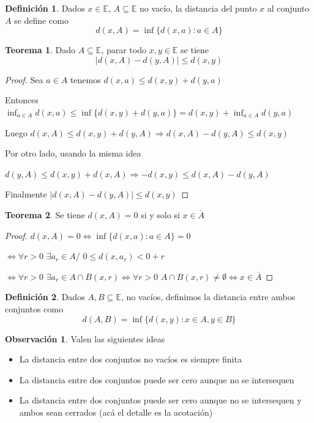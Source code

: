 \documentclass[12pt]{article}
\newcommand{\E}{\mathbb{E}}
\newcommand{\Ra}{\Rightarrow}
\newcommand{\ol}{\overline}
\theoremstyle{definition}
\newtheorem{definition}{Definición}[section]
\newtheorem*{remark}{Observación}
\newtheorem{theorem}{Teorema}
\begin{document}
\begin{definition}
  Dados $x \in \E$, $A \subseteq \E$ no vacío, la distancia del punto $x$ al conjunto $A$ se define como 
  $$d(x,A)  = \inf{\{d(x,a) : a \in A\}} $$
\end{definition}

\begin{theorem}
  Dado $A \subseteq \E$, parar todo $x,y \in \E$ se tiene
  $$ |d(x,A) - d(y,A)| \leq d(x,y)$$

  \begin{proof}
    Sea $a \in A$ tenemos $d(x,a) \leq d(x,y) + d(y,a)$

    Entonces $\inf_{a \in A}{d(x,a)} \leq  \inf \{d(x,y) + d(y,a)\} =     d(x,y) + \inf_{a \in A}{d(y,a)}$

    Luego $d(x,A) \leq d(x,y) + d(y,A) \Ra d(x,A) - d(y,A) \leq d(x,y)$

    Por otro lado, usando la misma idea  

    $d(y,A) \leq d(x,y) + d(x,A) \Ra -d(x,y) \leq d(x,A) - d(y,A)$

    Finalmente $|d(x,A) - d(y,A)| \leq d(x,y)$
  \end{proof}
\end{theorem}

\begin{theorem}
Se tiene $d(x,A) = 0 $ si y solo si $x \in \ol A$

\begin{proof}
  $d(x,A) = 0 \iff \inf{\{d(x,a): a \in A\}} = 0 $

 $ \iff \forall r>0$ $  \exists a_{r} \in A / $ $0 \leq d(x,a_{r}) < 0 + r$

 $\iff \forall r>0 $ $ \exists a_{r} \in A \cap B(x,r) \iff \forall r>0 $ $A \cap B(x,r) \neq \emptyset \iff x \in \ol A$
\end{proof}
\end{theorem}

\begin{definition}
  Dados $A,B \subseteq \E$, no vacíos, definimos la distancia entre ambos conjuntos como
  $$ d(A,B) = \inf{\{ d(x,y): x \in A, y \in B\}}$$
\end{definition}

\begin{remark}Valen las siguientes ideas
  \begin{itemize}
    \item La distancia entre dos conjuntos no vacíos es siempre finita
    \item La distancia entre dos conjuntos puede ser cero aunque no se intersequen 
    \item La distancia entre dos conjuntos puede ser cero aunque no se intersequen y ambos sean cerrados (acá el detalle es la acotación)
  \end{itemize}
\end{remark}
\end{document}
